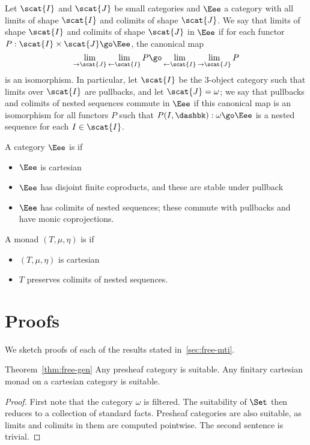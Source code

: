 Let $\scat{I}$ and $\scat{J}$ be small categories and $\Eee$ a category
with all limits of shape $\scat{I}$ and colimits of shape $\scat{J}$.  We
say that limits of shape $\scat{I}$ and colimits of shape $\scat{J}$
%
%
%
in $\Eee$ if for each functor $P: \scat{I} \times \scat{J}
\go \Eee$, the canonical map
%
\begin{equation}	\label{eq:lim-colim-map}
\lim_{\rightarrow\scat{J}} \lim_{\leftarrow\scat{I}} P
\go
\lim_{\leftarrow\scat{I}} \lim_{\rightarrow\scat{J}} P
\end{equation}
%
is an isomorphism.  In particular, let $\scat{I}$ be the 3-object category
such that limits over $\scat{I}$ are pullbacks, and let $\scat{J} =
\omega$; we say that pullbacks and colimits of nested sequences commute in
$\Eee$ if this canonical map is an isomorphism for all functors $P$ such
that $P(I,\dashbk): \omega \go \Eee$ is a nested sequence for each $I \in
\scat{I}$.

A category $\Eee$ is %
%
%
if
%
\begin{itemize}
\item $\Eee$ is cartesian
\item $\Eee$ has disjoint finite coproducts, and these are stable under
pullback
\item $\Eee$ has colimits of nested sequences; these commute with
pullbacks and have monic coprojections.
\end{itemize}
%
A monad $(T, \mu, \eta)$ is %
%
%
if
%
\begin{itemize}
\item $(T, \mu, \eta)$ is cartesian
\item $T$ preserves colimits of nested sequences.
\end{itemize}



\section{Proofs}

We sketch proofs of each of the results stated in~\ref{sec:free-mti}.

\begin{quotedthm}{Theorem~\ref{thm:free-gen}}
Any presheaf category is suitable.  Any finitary cartesian monad on a
cartesian category is suitable.
\end{quotedthm}
%
\begin{proof}
First note that the category $\omega$ is filtered.  The suitability of
$\Set$ then reduces to a collection of standard facts.  Presheaf categories
are also suitable, as limits and colimits in them are computed pointwise.  
The second sentence is trivial.  
\done
\end{proof}


